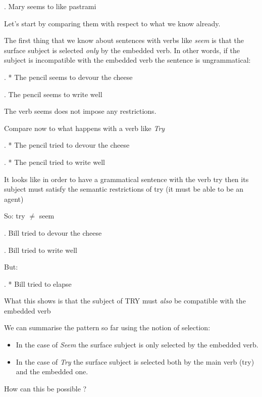 \ex.
Mary seems to like pastrami 



Let's start by comparing them with respect to what we know already.


\begin{frame}


The first thing that we know about sentences with verbs like \textit{seem} is that the surface subject is selected \textit{only} by the embedded verb.  In other words, if the subject is incompatible with the embedded verb the sentence is ungrammatical:

\ex.
* The pencil seems to devour the cheese

\ex.
The pencil seems to write well


The verb seems does not impose any restrictions.

  
\end{frame}


\begin{frame}
  Compare now to what happens with a verb like \textit{Try}

\ex.
* The pencil tried to devour the cheese

\ex.
* The pencil tried to write well


It looks like in order to have a grammatical sentence with the verb try then its subject must satisfy the semantic restrictions of try (it must be able to be an agent)

So:  try $\neq$ seem 

\end{frame}

\begin{frame}

\ex.
Bill tried to devour the cheese

\ex.
Bill tried to write well

But:

\ex.
* Bill tried to elapse

What this shows is that the subject of TRY must \textit{also} be compatible with the embedded verb

\end{frame}

\begin{frame}


We can summarise the pattern so far using the notion of selection:

\begin{itemize}
\item In the case of \textit{Seem} the surface subject is only selected by the embedded verb.
\item In the case of \textit{Try} the surface subject is selected both by the main verb (try) and the embedded one.  
\end{itemize}

\pause

How can this be possible ?
  
\end{frame}

